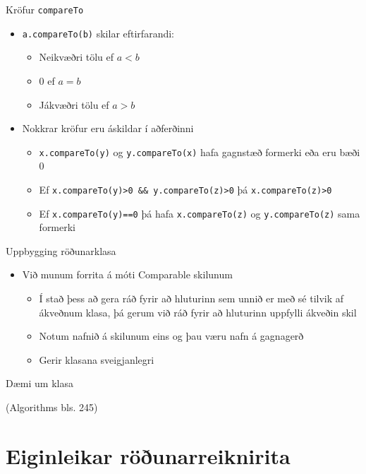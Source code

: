 \documentclass[handout]{beamer}
\begin{document}
\begin{frame}{Kröfur \texttt{compareTo}}
\begin{itemize}
 \item \texttt{a.compareTo(b)} skilar eftirfarandi:
 \begin{itemize}
  \item Neikvæðri tölu ef $a < b$
  \item 0 ef $a = b$
  \item Jákvæðri tölu ef $a > b$
 \end{itemize}

 \item Nokkrar kröfur eru áskildar í aðferðinni
 \begin{itemize}
  \item \texttt{x.compareTo(y)} og \texttt{y.compareTo(x)} hafa gagnstæð formerki eða eru bæði 0
  \item Ef \texttt{x.compareTo(y)>0 \&\& y.compareTo(z)>0} þá \texttt{x.compareTo(z)>0}
  \item Ef \texttt{x.compareTo(y)==0} þá hafa \texttt{x.compareTo(z)} og \texttt{y.compareTo(z)} sama formerki
 \end{itemize}
\end{itemize}
\end{frame}

\begin{frame}{Uppbygging röðunarklasa}
\begin{itemize}
 \item Við munum forrita á móti Comparable skilunum
 \begin{itemize}
  \item Í stað þess að gera ráð fyrir að hluturinn sem unnið er með sé tilvik af ákveðnum klasa, þá gerum við ráð fyrir að hluturinn uppfylli ákveðin skil
  \item Notum nafnið á skilunum eins og þau væru nafn á gagnagerð 
  \item Gerir klasana sveigjanlegri
 \end{itemize}
\end{itemize}
\end{frame}

\begin{frame}{Dæmi um klasa}

(Algorithms bls. 245)
\end{frame}

\section{Eiginleikar röðunarreiknirita}
\end{document}
